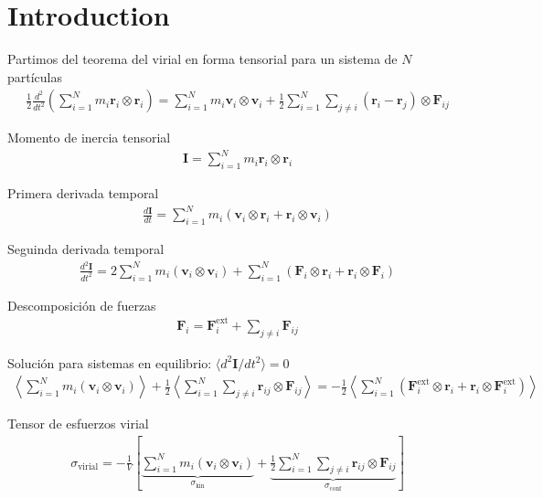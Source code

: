 \documentclass[../../main-notes.tex]{subfiles}
\begin{document}
\section{Introduction}


Partimos del teorema del virial en forma tensorial para un sistema de $N$ partículas
\begin{gather*}
    \frac{1}{2}\frac{d^2}{dt^2}\left(\sum_{i=1}^N m_i \mathbf{r}_i \otimes \mathbf{r}_i\right) = \sum_{i=1}^N m_i \mathbf{v}_i \otimes \mathbf{v}_i + \frac{1}{2}\sum_{i=1}^N \sum_{j\neq i} (\mathbf{r}_i - \mathbf{r}_j) \otimes \mathbf{F}_{ij}
\end{gather*}

Momento de inercia tensorial
\begin{gather*}
\mathbf{I} = \sum_{i=1}^N m_i \mathbf{r}_i \otimes \mathbf{r}_i
\end{gather*}

Primera derivada temporal
\begin{gather*}
\frac{d\mathbf{I}}{dt} = \sum_{i=1}^N m_i \left( \mathbf{v}_i \otimes \mathbf{r}_i + \mathbf{r}_i \otimes \mathbf{v}_i \right)
\end{gather*}


Seguinda derivada temporal
\begin{gather*}
\frac{d^2\mathbf{I}}{dt^2} = 2\sum_{i=1}^N m_i (\mathbf{v}_i \otimes \mathbf{v}_i) + \sum_{i=1}^N (\mathbf{F}_i \otimes \mathbf{r}_i + \mathbf{r}_i \otimes \mathbf{F}_i)
\end{gather*}

Descomposición de fuerzas
\begin{gather*}
\mathbf{F}_i = \mathbf{F}_i^{\text{ext}} + \sum_{j\neq i} \mathbf{F}_{ij}
\end{gather*}


Solución para sistemas en equilibrio: $\langle d^2\mathbf{I}/dt^2\rangle=0$
\begin{gather*}
\left\langle \sum_{i=1}^N m_i (\mathbf{v}_i \otimes \mathbf{v}_i) \right\rangle + \frac{1}{2}\left\langle \sum_{i=1}^N \sum_{j\neq i} \mathbf{r}_{ij} \otimes \mathbf{F}_{ij} \right\rangle = -\frac{1}{2}\left\langle \sum_{i=1}^N (\mathbf{F}_i^{\text{ext}} \otimes \mathbf{r}_i + \mathbf{r}_i \otimes \mathbf{F}_i^{\text{ext}}) \right\rangle
\end{gather*}


Tensor de esfuerzos virial
\begin{gather*}
\boxed{\sigma_{\text{virial}} = -\frac{1}{V} \left[ \underbrace{\sum_{i=1}^N m_i (\mathbf{v}_i \otimes \mathbf{v}_i)}_{\sigma_{\text{kin}}} + \underbrace{\frac{1}{2}\sum_{i=1}^N \sum_{j\neq i} \mathbf{r}_{ij} \otimes \mathbf{F}_{ij}}_{\sigma_{\text{conf}}}\right]} 
\end{gather*}
\end{document}
